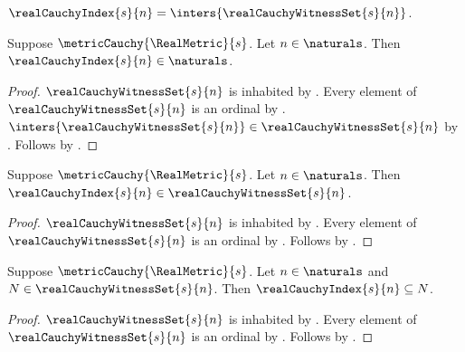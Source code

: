 \begin{definition}\label{real_cauchy_index}
    $\realCauchyIndex{s}{n}=\inters{\realCauchyWitnessSet{s}{n}}$.
\end{definition}

\begin{proposition}\label{real_cauchy_index_is_natural}
    Suppose $\metricCauchy{\RealMetric}{s}$.
    Let $n\in\naturals$.
    Then $\realCauchyIndex{s}{n}\in\naturals$.
\end{proposition}
\begin{proof}
    $\realCauchyWitnessSet{s}{n}$ is inhabited
        by .
    Every element of $\realCauchyWitnessSet{s}{n}$ is an ordinal
        by
        .
    $\inters{\realCauchyWitnessSet{s}{n}}
        \in\realCauchyWitnessSet{s}{n}$
        by .
    Follows by
        .
\end{proof}

\begin{proposition}\label{real_cauchy_index_is_witness}
    Suppose $\metricCauchy{\RealMetric}{s}$.
    Let $n\in\naturals$.
    Then $\realCauchyIndex{s}{n}\in\realCauchyWitnessSet{s}{n}$.
\end{proposition}
\begin{proof}
    $\realCauchyWitnessSet{s}{n}$ is inhabited
        by .
    Every element of $\realCauchyWitnessSet{s}{n}$ is an ordinal
        by
        .
    Follows by .
\end{proof}

\begin{proposition}\label{real_cauchy_index_least}
    Suppose $\metricCauchy{\RealMetric}{s}$.
    Let $n\in\naturals$ and $N\in\realCauchyWitnessSet{s}{n}$.
    Then $\realCauchyIndex{s}{n}\subseteq N$.
\end{proposition}
\begin{proof}
    $\realCauchyWitnessSet{s}{n}$ is inhabited
        by .
    Every element of $\realCauchyWitnessSet{s}{n}$ is an ordinal
        by
        .
    Follows by
        .
\end{proof}

